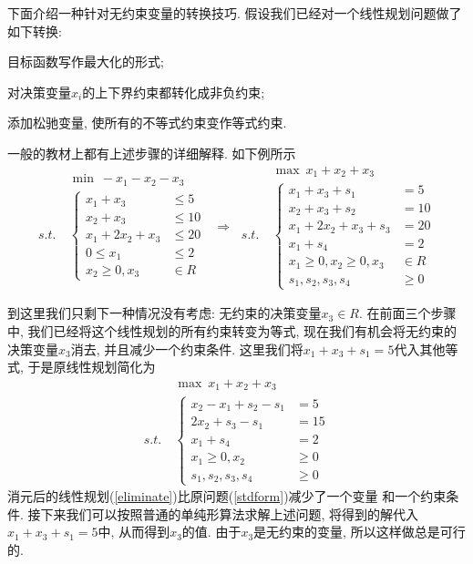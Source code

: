 \documentclass[a4paper,12pt]{article}
\begin{document}
\begin{CJK*}{UTF8}{gbsn}
下面介绍一种针对无约束变量的转换技巧. 
假设我们已经对一个线性规划问题做了如下转换: 
\begin{compactenum}[(1)]
\item 目标函数写作最大化的形式; 
\item 对决策变量$x_{i}$的上下界约束都转化成非负约束; 
\item 添加松驰变量, 使所有的不等式约束变作等式约束. 
\end{compactenum}
一般的教材上都有上述步骤的详细解释. 如下例所示
\begin{equation}
\begin{aligned}
	&\min~-x_{1} - x_{2} - x_{3} \\
	s.t.~&\left\{ \begin{aligned}
	x_{1} + x_{3} &\leq 5\\
	x_{2} + x_{3} &\leq 10\\
	x_{1} + 2 x_{2} + x_{3} &\leq 20\\
	0 \leq x_{1} &\leq 2\\
	x_{2} \geq 0, x_{3} &\in R
	\end{aligned}\right.
\end{aligned}
~\Longrightarrow~
\begin{aligned}
	&\max~x_{1} + x_{2} + x_{3} \\
	s.t.~&\left\{ \begin{aligned}
	x_{1} + x_{3} + s_{1}&= 5\\
	x_{2} + x_{3} + s_{2}&= 10\\
	x_{1} + 2 x_{2} + x_{3} + s_{3}&= 20\\
	x_{1} + s_{4} &= 2\\
	x_{1} \geq 0, x_{2} \geq 0, x_{3} &\in R\\
	s_{1}, s_{2}, s_{3}, s_{4} &\geq 0
	\end{aligned}\right.
\end{aligned}
\label{stdform}
\end{equation}

到这里我们只剩下一种情况没有考虑: 无约束的决策变量$x_{3} \in R$. 
在前面三个步骤中, 我们已经将这个线性规划的所有约束转变为等式, 
现在我们有机会将无约束的决策变量$x_{3}$消去, 并且减少一个约束条件. 
这里我们将$x_{1} + x_{3} + s_{1}= 5$代入其他等式, 
于是原线性规划简化为
\begin{equation}
\begin{aligned}
	&\max~x_{1} + x_{2} + x_{3} \\
	s.t.~&\left\{ \begin{aligned}
	x_{2} - x_{1} + s_{2} - s_{1}&= 5\\
	2 x_{2} + s_{3} - s_{1}&= 15\\
	x_{1} + s_{4} &= 2\\
	x_{1} \geq 0, x_{2} &\geq 0\\
	s_{1}, s_{2}, s_{3}, s_{4} &\geq 0
	\end{aligned}\right.
\end{aligned}
\label{eliminate}
\end{equation}
消元后的线性规划(\ref{eliminate})比原问题(\ref{stdform})减少了一个变量
和一个约束条件. 接下来我们可以按照普通的单纯形算法求解上述问题, 
将得到的解代入$x_{1} + x_{3} + s_{1}= 5$中, 从而得到$x_{3}$的值. 
由于$x_{3}$是无约束的变量, 所以这样做总是可行的. 


\end{CJK*}
\end{document}
